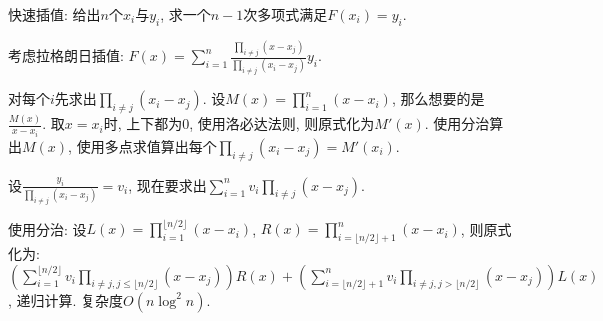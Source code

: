 快速插值: 给出$n$个$x_i$与$y_i$, 求一个$n-1$次多项式满足$F(x_i)=y_i$.

考虑拉格朗日插值: $F(x)=\sum_{i=1}^n\frac{\prod_{i\neq j}(x-x_j)}{\prod_{i\neq j}(x_i-x_j)}y_i$.

对每个$i$先求出$\prod_{i\neq j}(x_i-x_j)$. 设$M(x)=\prod_{i=1}^{n}(x-x_i)$, 那么想要的是$\frac{M(x)}{x-x_i}$. 取$x=x_i$时, 上下都为0, 使用洛必达法则, 则原式化为$M'(x)$. 使用分治算出$M(x)$, 使用多点求值算出每个$\prod_{i\neq j}(x_i-x_j)=M'(x_i)$.

设$\frac{y_i}{\prod_{i\neq j}(x_i-x_j)}=v_i$, 现在要求出$\sum_{i=1}^{n}v_i\prod_{i\neq j}(x-x_j)$.

使用分治: 设$L(x)=\prod_{i=1}^{\lfloor n/2\rfloor}(x-x_i)$, $R(x)=\prod_{i=\lfloor n/2\rfloor+1}^n(x-x_i)$, 则原式化为: $\left( \sum_{i=1}^{\lfloor n/2\rfloor}v_i\prod_{i\neq j,j\leq\lfloor n/2\rfloor}(x-x_j)\right)R(x)+\left( \sum_{i=\lfloor n/2\rfloor+1}^{n}v_i\prod_{i\neq j,j>\lfloor n/2\rfloor}(x-x_j)\right)L(x)$, 递归计算. 复杂度$O(n\log^2n)$. \par
